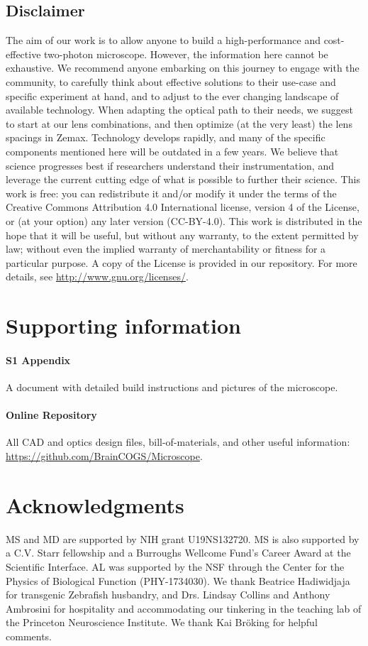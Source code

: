 \documentclass[10pt,letterpaper]{article}
\begin{document}
\subsection*{Disclaimer}
The aim of our work is to allow anyone to build a high-performance and cost-effective two-photon microscope. However, the information here cannot be exhaustive. We recommend anyone embarking on this journey to engage with the community, to carefully think about effective solutions to their use-case and specific experiment at hand, and to adjust to the ever changing landscape of available technology. When adapting the optical path to their needs, we suggest to start at our lens combinations, and then optimize (at the very least) the lens spacings in Zemax. Technology develops rapidly, and many of the specific components mentioned here will be outdated in a few years. We believe that science progresses best if researchers understand their instrumentation, and leverage the current cutting edge of what is possible to further their science.\newline
This work is free: you can redistribute it and/or modify it under the terms of the Creative Commons Attribution 4.0 International license, version 4 of the License, or (at your option) any later version (CC-BY-4.0). This work is distributed in the hope that it will be useful, but without any warranty, to the extent permitted by law; without even the implied warranty of merchantability or fitness for a particular purpose. A copy of the License is provided in our repository.  For more details, see \url{http://www.gnu.org/licenses/}.

\section*{Supporting information}

\paragraph*{S1 Appendix}
\label{S1_Appendix}
A document with detailed build instructions and pictures of the microscope.

\paragraph*{Online Repository}
\label{repository}
All CAD and optics design files, bill-of-materials, and other useful information: \url{https://github.com/BrainCOGS/Microscope}.

\section*{Acknowledgments}
MS and MD are supported by NIH grant U19NS132720. MS is also supported by a C.V. Starr fellowship and a Burroughs Wellcome Fund's Career Award at the Scientific Interface. AL was supported by the NSF through the Center for the Physics of Biological Function (PHY-1734030). We thank Beatrice Hadiwidjaja for transgenic Zebrafish husbandry, and Drs. Lindsay Collins and Anthony Ambrosini for hospitality and accommodating our tinkering in the teaching lab of the Princeton Neuroscience Institute. We thank Kai Br\"oking for helpful comments.
\end{document}
